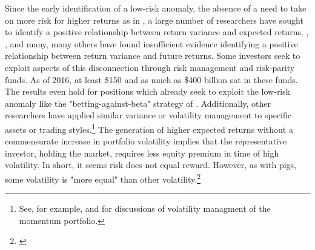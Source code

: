 Since the early identification of a low-risk anomaly, the absence of a need to take on more risk for higher returns as in \citet{haugen_1972}, a large number of researchers have sought to identify a positive relationship between return variance and expected returns. \citet{CAMPBELL1987373}, \cite{FRENCH19873}, \citet{glosten_1993} and many, many others have found insufficient evidence identifying a positive relationship between return variance and future returns. Some investors seek to exploit aspects of this disconnection through risk management and risk-parity funds. As of 2016, at least \$150 and as much as \$400 billion sat in these funds.\citep{steward_truly_2010,cao_risk_2016} The \citet{moreira_volatility-managed_2017} results even hold for positions which already seek to exploit the low-risk anomaly like the "betting-against-beta" strategy of \citet{frazzini_betting_2014}. Additionally, other researchers have applied similar variance or volatility management to specific assets or trading styles.\footnote{See, for example, \citet{barroso_momentum_2015} and \citet{kim_time_2016} for discussions of volatility managment of the momentum portfolio.} The generation of higher expected returns without a commensurate increase in portfolio volatility implies that the representative investor, holding the market, requires less equity premium in time of high volatility. %
In short, it seems risk does not equal reward. However, as with pigs, some volatility is "more equal" than other volatility.\footnote{\citep{orwell1946animal}} 

